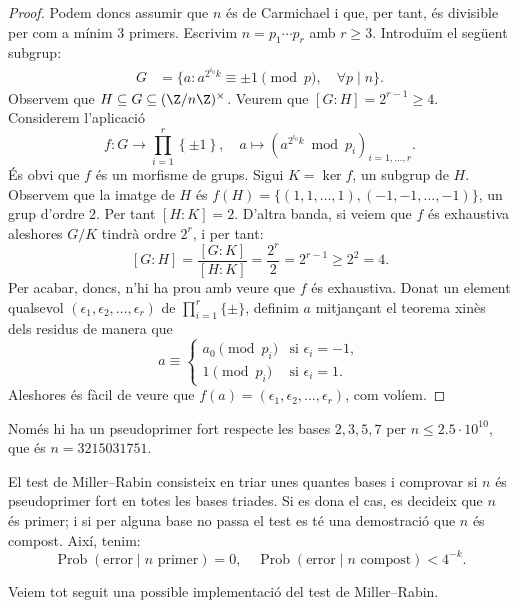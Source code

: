 \begin{proof}
Podem doncs assumir que $n$ és de Carmichael i que, per tant, és divisible per com a mínim $3$ primers. Escrivim $n=p_1\cdots p_r$ amb $r\geq 3$. Introduïm el següent subgrup:
\begin{align*}
    G &= \{ a \colon a^{2^{i_0} k}\equiv \pm 1 \pmod{p},
    \quad \forall p\mid n\}.
\end{align*}
Observem que $H\subseteq G\subseteq(\Z/n\Z)^\times$. 
Veurem que $[G\colon H]=2^{r-1}\geq 4$. Considerem l'aplicació
\[
f\colon G \to \prod_{i=1}^r \left\{\pm 1\right\},\quad a \mapsto ( a^{2^{i_0}k}\bmod {p_i})_{i=1,\ldots,r}.
\]
És obvi que $f$ és un morfisme de grups. Sigui $K=\ker f$, un subgrup de $H$. Observem que la imatge de $H$ és $f(H) = \{(1,1,\ldots,1),(-1,-1,\ldots,-1)\}$, un grup d'ordre $2$. Per tant $[H\colon K]=2$. D'altra banda, si veiem que $f$ és exhaustiva aleshores $G/K$ tindrà ordre $2^r$, i per tant:
\[
[G\colon H] = \frac{[G\colon K]}{[H\colon K]} = \frac{2^r}{2}=2^{r-1}\geq 2^2=4.
\]
Per acabar, doncs, n'hi ha prou amb veure que $f$ és exhaustiva. Donat un element qualsevol $(\epsilon_1,\epsilon_2,\ldots,\epsilon_r)$ de $\prod_{i=1}^r \{\pm\}$, definim $a$ mitjançant el teorema xinès dels residus de manera que
\[
a\equiv\begin{cases}
a_0\pmod{p_i} &\text{si }\epsilon_i = -1,\\
1\pmod{p_i} &\text{si } \epsilon_i = 1.
\end{cases}
\]
Aleshores és fàcil de veure que $f(a)=(\epsilon_1,\epsilon_2,\ldots,\epsilon_r)$, com volíem.
 \end{proof}
 \begin{remark}
 Només hi ha un pseudoprimer fort respecte les bases $2, 3, 5, 7$ per $n\leq 2.5\cdot 10^{10}$, que és $n=3215031751$.
 \end{remark}
 
 El test de Miller--Rabin consisteix en triar unes quantes bases i comprovar si $n$ és pseudoprimer fort en totes les bases triades. Si es dona el cas, es decideix que $n$ és primer; i si per alguna base no passa el test es té una demostració que $n$ és compost. Així, tenim:
 \[
 \operatorname{Prob}(\text{error} \mid n\text{ primer}) = 0,\quad \operatorname{Prob}(\text{error} \mid n\text{ compost})<4^{-k}.
 \]
 
 Veiem tot seguit una possible implementació del test de Miller--Rabin.

